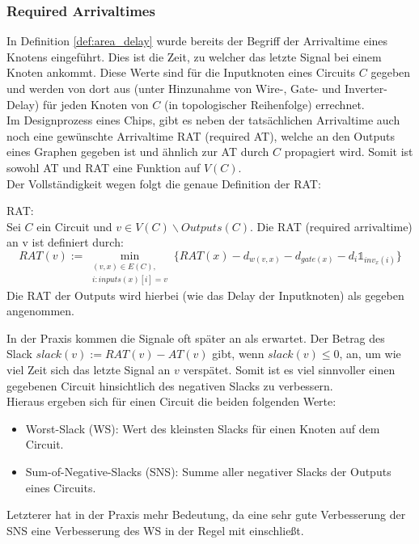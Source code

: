 \documentclass[11pt, a4paper, german]{article}
\begin{document}
\subsubsection{Required Arrivaltimes}
\label{subsec:rat}
In Definition \ref{def:area_delay} wurde bereits der Begriff der Arrivaltime eines Knotens eingeführt. Dies ist die Zeit, zu welcher das letzte Signal bei einem Knoten ankommt. Diese Werte sind für die Inputknoten eines Circuits $C$ gegeben und werden von dort aus (unter Hinzunahme von Wire-, Gate- und Inverter-Delay) für jeden Knoten von $C$ (in topologischer Reihenfolge) errechnet.\\
Im Designprozess eines Chips, gibt es neben der tatsächlichen Arrivaltime auch noch eine  gewünschte Arrivaltime RAT (required AT), welche an den Outputs eines Graphen gegeben ist und ähnlich zur AT durch $C$ propagiert wird. Somit ist sowohl AT und RAT eine Funktion auf $V(C)$. \\
Der Vollständigkeit wegen folgt die genaue Definition der RAT:\\

\begin{definition}{RAT:}\\
	Sei $C$ ein Circuit und $v \in V(C)\backslash  Outputs(C)$. Die RAT (required arrivaltime) an v ist definiert durch:
	\[   RAT(v) := \min\limits_{ \substack{(v,x)\in E(C), \\ i: inputs(x)[i] = v }} \{ RAT(x) - d_{w(v,x)} - d_{gate(x)} - d_{i} \mathbb{1}_{inv_x(i)} \}\] 
	Die RAT der Outputs wird hierbei (wie das Delay der Inputknoten) als gegeben angenommen. 
\end{definition}

In der Praxis kommen die Signale oft später an als erwartet. Der Betrag des Slack $slack(v) := RAT(v) - AT(v)$ gibt, wenn $slack(v) \leq 0 $, an, um wie viel Zeit sich das letzte Signal an $v$ verspätet. Somit ist es viel sinnvoller einen gegebenen Circuit hinsichtlich des negativen Slacks zu verbessern. \\
Hieraus ergeben sich für einen Circuit die beiden folgenden Werte: 
\begin{itemize}
	\item Worst-Slack (WS): Wert des kleinsten Slacks für einen Knoten auf dem Circuit.
	\item Sum-of-Negative-Slacks (SNS): Summe aller negativer Slacks der Outputs eines Circuits.
\end{itemize}
Letzterer hat in der Praxis mehr Bedeutung, da eine sehr gute Verbesserung der SNS eine Verbesserung des WS in der Regel mit einschließt. \\
\end{document}
